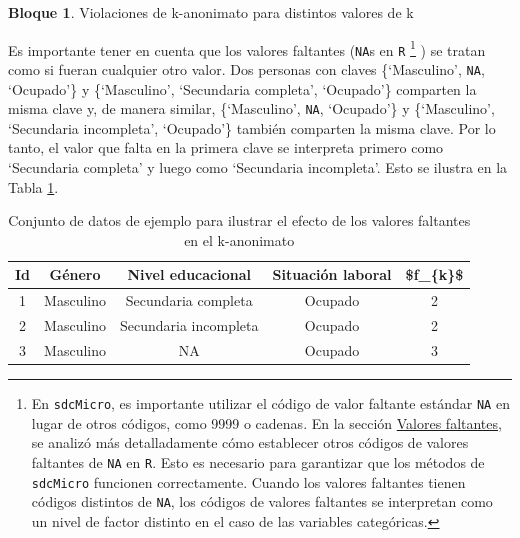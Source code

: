 \documentclass[]{book}
\newenvironment{Shaded}{\begin{snugshade}}{\end{snugshade}}
\newcommand{\DecValTok}[1]{\textcolor[rgb]{0.00,0.00,0.81}{#1}}
\newcommand{\KeywordTok}[1]{\textcolor[rgb]{0.13,0.29,0.53}{\textbf{#1}}}
\newcommand{\NormalTok}[1]{#1}
\newcommand{\OperatorTok}[1]{\textcolor[rgb]{0.81,0.36,0.00}{\textbf{#1}}}
\newcommand{\StringTok}[1]{\textcolor[rgb]{0.31,0.60,0.02}{#1}}
\theoremstyle{definition}
\theoremstyle{definition}
\newtheorem{example}{Bloque}[chapter]
\theoremstyle{definition}
\theoremstyle{definition}
\theoremstyle{remark}
\begin{document}
\begin{example}
\protect\hypertarget{exm:bloqueMR5}{}{\label{exm:bloqueMR5} }Violaciones de k-anonimato para distintos valores de k
\end{example}

\begin{Shaded}
\end{Shaded}

Es importante tener en cuenta que los valores faltantes (\texttt{NA}s en \texttt{R} \footnote{En \texttt{sdcMicro}, es importante utilizar el código de valor faltante estándar \texttt{NA} en lugar de otros códigos, como 9999 o cadenas. En la sección \protect\hyperlink{valores-faltantes}{Valores faltantes}, se analizó más detalladamente cómo establecer otros códigos de valores faltantes de \texttt{NA} en \texttt{R}. Esto es necesario para garantizar que los métodos de \texttt{sdcMicro} funcionen correctamente. Cuando los valores faltantes tienen códigos distintos de \texttt{NA}, los códigos de valores faltantes se interpretan como un nivel de factor distinto en el caso de las variables categóricas.} ) se tratan como si fueran cualquier otro valor. Dos personas con claves \{`Masculino', \texttt{NA}, `Ocupado'\} y \{`Masculino', `Secundaria completa', `Ocupado'\} comparten la misma clave y, de manera similar, \{`Masculino', \texttt{NA}, `Ocupado'\} y \{`Masculino', `Secundaria incompleta', `Ocupado'\} también comparten la misma clave. Por lo tanto, el valor que falta en la primera clave se interpreta primero como `Secundaria completa' y luego como `Secundaria incompleta'. Esto se ilustra en la Tabla \ref{tab:tabMR2}.

\begin{table}

\caption{\label{tab:tabMR2}Conjunto de datos de ejemplo para ilustrar el efecto de los valores faltantes en el k-anonimato}
\centering
\begin{tabular}[t]{c|c|c|c|c}
\hline
Id & Género & Nivel educacional & Situación laboral & \$f\_\{k\}\$\\
\hline
1 & Masculino & Secundaria completa & Ocupado & 2\\
\hline
2 & Masculino & Secundaria incompleta & Ocupado & 2\\
\hline
3 & Masculino & NA & Ocupado & 3\\
\hline
\end{tabular}
\end{table}
\end{document}
